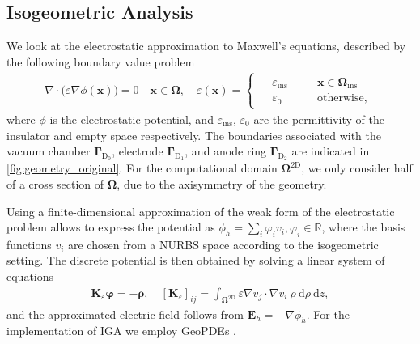 \documentclass[journal, transmag]{IEEEtran}
\begin{document}
    \subsection{Isogeometric Analysis}
    We look at the electrostatic approximation to Maxwell's equations, described by the following boundary value problem
    \begin{align*}
        \nabla \cdot \Big( \varepsilon \nabla \phi(\mathbf{x}) \Big) = 0 \quad \mathbf{x} \in \boldsymbol{\Omega}, \quad \varepsilon(\mathbf{x}) =
        \begin{cases}
            \begin{alignedat}{2}
                &\varepsilon_{\mathrm{ins}} &\quad &\mathbf{x} \in \boldsymbol{\Omega}_{\mathrm{ins}}\\
                &\varepsilon_0 &\quad &\text{otherwise},
            \end{alignedat}
        \end{cases}
    \end{align*}
    where $\phi$ is the electrostatic potential, and $\varepsilon_{\mathrm{ins}}$, $\varepsilon_0$ are the permittivity of the insulator and empty space respectively. The boundaries associated with the vacuum chamber $\boldsymbol{\Gamma}_{\mathrm{D}_0}$, electrode $\boldsymbol{\Gamma}_{\mathrm{D}_1}$, and anode ring $\boldsymbol{\Gamma}_{\mathrm{D}_2}$ are indicated in \autoref{fig:geometry_original}. For the computational domain $\boldsymbol{\Omega}^{\mathrm{2D}}$, we only consider half of a cross section of $\boldsymbol{\Omega}$, due to the axisymmetry of the geometry.

    Using a finite-dimensional approximation of the weak form of the electrostatic problem allows to express the potential as $\phi_h = \sum_i \varphi_i v_i, \varphi_i \in \mathbb{R}$, where the basis functions $v_i$ are chosen from a NURBS space according to the isogeometric setting. The discrete potential is then obtained by solving a linear system of equations
    \begin{align*}
        \mathbf{K}_\varepsilon \boldsymbol{\varphi} = - \boldsymbol{\rho}, \quad [\mathbf{K}_\varepsilon]_{ij} = \int_{\boldsymbol{\Omega}^{\mathrm{2D}}} \varepsilon \nabla v_j \cdot \nabla v_i\: \rho\: \mathrm{d}\rho\: \mathrm{d}z,
    \end{align*}
    and the approximated electric field follows from $\mathbf{E}_h = - \nabla \phi_h$. For the implementation of IGA we employ GeoPDEs \cite{vazquez2016}.
\end{document}
